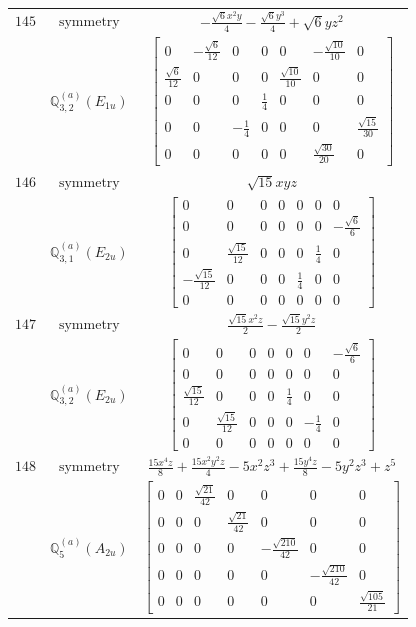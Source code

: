 \documentclass[fleqn,8pt,landscape]{jsarticle}
\begin{document}
\begin{longtable}{ccc}
$ 145 $ & $ \text{symmetry} $ & $ - \frac{\sqrt{6} x^{2} y}{4} - \frac{\sqrt{6} y^{3}}{4} + \sqrt{6} y z^{2} $ \\
$  $ & $ \mathbb{Q}_{3,2}^{(a)}(E_{1u}) $ & $ \begin{bmatrix} 0 & - \frac{\sqrt{6}}{12} & 0 & 0 & 0 & - \frac{\sqrt{10}}{10} & 0 \\ \frac{\sqrt{6}}{12} & 0 & 0 & 0 & \frac{\sqrt{10}}{10} & 0 & 0 \\ 0 & 0 & 0 & \frac{1}{4} & 0 & 0 & 0 \\ 0 & 0 & - \frac{1}{4} & 0 & 0 & 0 & \frac{\sqrt{15}}{30} \\ 0 & 0 & 0 & 0 & 0 & \frac{\sqrt{30}}{20} & 0 \end{bmatrix} $ \\ \hline
$ 146 $ & $ \text{symmetry} $ & $ \sqrt{15} x y z $ \\
$  $ & $ \mathbb{Q}_{3,1}^{(a)}(E_{2u}) $ & $ \begin{bmatrix} 0 & 0 & 0 & 0 & 0 & 0 & 0 \\ 0 & 0 & 0 & 0 & 0 & 0 & - \frac{\sqrt{6}}{6} \\ 0 & \frac{\sqrt{15}}{12} & 0 & 0 & 0 & \frac{1}{4} & 0 \\ - \frac{\sqrt{15}}{12} & 0 & 0 & 0 & \frac{1}{4} & 0 & 0 \\ 0 & 0 & 0 & 0 & 0 & 0 & 0 \end{bmatrix} $ \\ \hline
$ 147 $ & $ \text{symmetry} $ & $ \frac{\sqrt{15} x^{2} z}{2} - \frac{\sqrt{15} y^{2} z}{2} $ \\
$  $ & $ \mathbb{Q}_{3,2}^{(a)}(E_{2u}) $ & $ \begin{bmatrix} 0 & 0 & 0 & 0 & 0 & 0 & - \frac{\sqrt{6}}{6} \\ 0 & 0 & 0 & 0 & 0 & 0 & 0 \\ \frac{\sqrt{15}}{12} & 0 & 0 & 0 & \frac{1}{4} & 0 & 0 \\ 0 & \frac{\sqrt{15}}{12} & 0 & 0 & 0 & - \frac{1}{4} & 0 \\ 0 & 0 & 0 & 0 & 0 & 0 & 0 \end{bmatrix} $ \\ \hline
$ 148 $ & $ \text{symmetry} $ & $ \frac{15 x^{4} z}{8} + \frac{15 x^{2} y^{2} z}{4} - 5 x^{2} z^{3} + \frac{15 y^{4} z}{8} - 5 y^{2} z^{3} + z^{5} $ \\
$  $ & $ \mathbb{Q}_{5}^{(a)}(A_{2u}) $ & $ \begin{bmatrix} 0 & 0 & \frac{\sqrt{21}}{42} & 0 & 0 & 0 & 0 \\ 0 & 0 & 0 & \frac{\sqrt{21}}{42} & 0 & 0 & 0 \\ 0 & 0 & 0 & 0 & - \frac{\sqrt{210}}{42} & 0 & 0 \\ 0 & 0 & 0 & 0 & 0 & - \frac{\sqrt{210}}{42} & 0 \\ 0 & 0 & 0 & 0 & 0 & 0 & \frac{\sqrt{105}}{21} \end{bmatrix} $ \\ \hline

\end{longtable}
\end{document}
